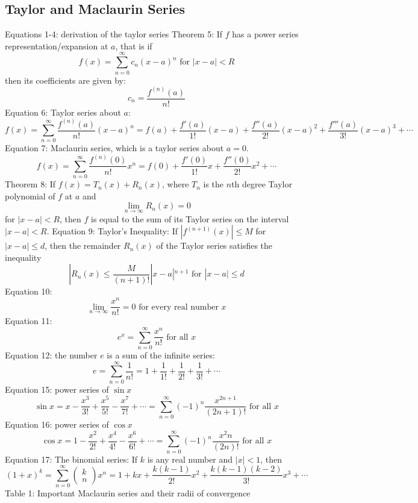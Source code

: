 \documentclass{article}
\begin{document}
    \subsection{Taylor and Maclaurin Series}
    \begin{outline}
        \1 Equations 1-4: derivation of the taylor series
        \1 Theorem 5: If $f$ has a power series representation/expansion at $a$, that is if \[f(x)=\sum^\infty_{n=0}c_n(x-a)^n \text{ for } |x-a|<R\] then its coefficients are given by: \[c_n=\dfrac{f^{(n)}(a)}{n!}\]
        \1 Equation 6: Taylor series about $a$: \[f(x)=\sum^\infty_{n=0}\dfrac{f^{(n)}(a)}{n!}(x-a)^n=f(a)+\dfrac{f'(a)}{1!}(x-a)+\dfrac{f''(a)}{2!}(x-a)^2+\dfrac{f'''(a)}{3!}(x-a)^3+\cdots\]
        \1 Equation 7: Maclaurin series, which is a taylor series about $a=0$. \[f(x)=\sum^\infty_{n=0}\dfrac{f^{(n)}(0)}{n!}x^n=f(0)+\dfrac{f'(0)}{1!}x+\dfrac{f''(0)}{2!}x^2+\cdots\]
        \1 Theorem 8: If \(f(x)=T_n(x)+R_n(x)\), where $T_n$ is the $n$th degree Taylor polynomial of $f$ at $a$ and \[\lim_{n\to\infty}R_n(x)=0\] for \(|x-a|<R\), then $f$ is equal to the sum of its Taylor series on the interval \(|x-a|<R\). 
        \1 Equation 9: Taylor's Inequality: If \(|f^{(n+1)}(x)|\leq M\) for \(|x-a|\leq d\), then the remainder \(R_n(x)\) of the Taylor series satisfies the inequality \[|R_n(x)\leq\dfrac{M}{(n+1)!}|x-a|^{n+1}\mbox{ for }|x-a|\leq d\]
        \1 Equation 10: \[\lim_{n\to\infty}\dfrac{x^n}{n!}=0\mbox{ for every real number }x\]
        \1 Equation 11: \[e^x=\sum^\infty_{n=0}\dfrac{x^n}{n!}\mbox{ for all }x\]
        \1 Equation 12: the number $e$ is a sum of the infinite series: \[e=\sum^\infty_{n=0}\dfrac{1}{n!}=1+\dfrac{1}{1!}+\dfrac{1}{2!}+\dfrac{1}{3!}+\cdots\]
        \1 Equation 15: power series of \(\sin x\)\[\sin x=x-\dfrac{x^3}{3!}+\dfrac{x^5}{5!}-\dfrac{x^7}{7!}+\cdots=\sum^\infty_{n=0}(-1)^n\dfrac{x^{2n+1}}{(2n+1)!}\mbox{ for all }x\]
        \1 Equation 16: power series of \(\cos x\)\[\cos x=1-\dfrac{x^2}{2!}+\dfrac{x^4}{4!}-\dfrac{x^6}{6!}+\cdots=\sum^\infty_{n=0}(-1)^n\dfrac{x^2n}{(2n)!}\text{ for all }x\]
        \1 Equation 17: The binomial series: If $k$ is any real number and \(|x|<1\), then \[(1+x)^k=\sum^\infty_{n=0}\begin{pmatrix}k\\n\end{pmatrix}x^n=1+kx+\dfrac{k(k-1)}{2!}x^2+\dfrac{k(k-1)(k-2)}{3!}x^3+\cdots\]
        \1 Table 1: Important Maclaurin series and their radii of convergence
    \end{outline}
\end{document}
